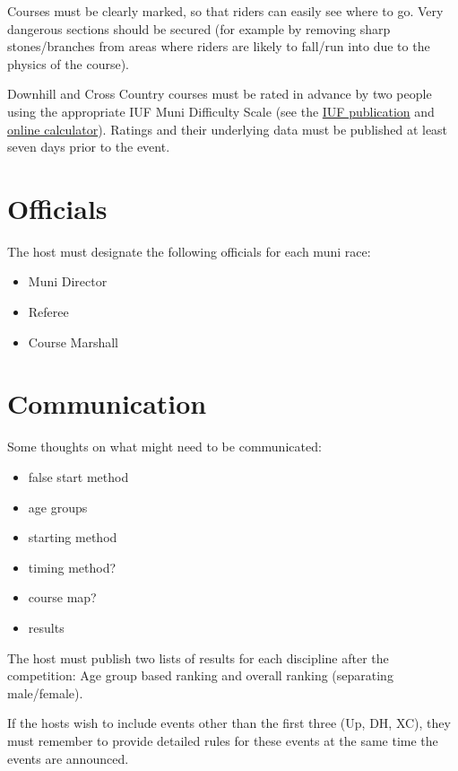 Courses must be clearly marked, so that riders can easily see where to go.
Very dangerous sections should be secured (for example by removing sharp stones/branches from areas where riders are likely to fall/run into due to the physics of the course).

Downhill and Cross Country courses must be rated in advance by two people using the appropriate IUF Muni Difficulty Scale (see the \href{https://unicycling.org/files/iuf-muni-difficulty-scale.pdf}{IUF publication} and \href{https://muni-scale.info/}{online calculator}).
Ratings and their underlying data must be published at least seven days prior to the event.

\section{Officials}

The host must designate the following officials for each muni race:
\begin{itemize}
\item Muni Director
\item Referee
\item Course Marshall
\end{itemize}

\section{Communication}

\begin{comment2016}
Some thoughts on what might need to be communicated:
\begin{itemize}
\item false start method
\item age groups
\item starting method
\item timing method?
\item course map?
\item results
\end{itemize}
\end{comment2016}

The host must publish two lists of results for each discipline after the competition: Age group based ranking and overall ranking (separating
male/female).

If the hosts wish to include events other than the first three (Up, DH, XC), they must remember to provide detailed rules for these events at the same time the events are announced.

